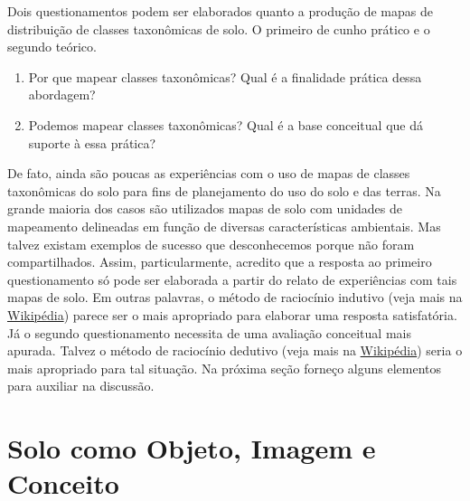 Dois questionamentos podem ser elaborados quanto a produção de mapas de distribuição de classes taxonômicas de solo. O primeiro de cunho prático e o segundo teórico.




\begin{enumerate}
 \item Por que mapear classes taxonômicas? Qual é a finalidade prática dessa abordagem?
 \item Podemos mapear classes taxonômicas? Qual é a base conceitual que dá suporte à essa prática?
\end{enumerate}




De fato, ainda são poucas as experiências com o uso de mapas de classes taxonômicas do solo para fins de planejamento do uso do solo e das terras. Na grande maioria dos casos são utilizados mapas de solo com unidades de mapeamento delineadas em função de diversas características ambientais. Mas talvez existam exemplos de sucesso que desconhecemos porque não foram compartilhados. Assim, particularmente, acredito que a resposta ao primeiro questionamento só pode ser elaborada a partir do relato de experiências com tais mapas de solo. Em outras palavras, o método de raciocínio indutivo (veja mais na \href{http://pt.wikipedia.org/wiki/M\%C3\%A9todo\_indutivo}{Wikipédia}) parece ser o mais apropriado para elaborar uma resposta satisfatória. Já o segundo questionamento necessita de uma avaliação conceitual mais apurada. Talvez o método de raciocínio dedutivo (veja mais na \href{http://pt.wikipedia.org/wiki/M\%C3\%A9todo\_dedutivo}{Wikipédia}) seria o mais apropriado para tal situação. Na próxima seção forneço alguns elementos para auxiliar na discussão.




\section{Solo como Objeto, Imagem e Conceito}
\label{sec:conceito}




